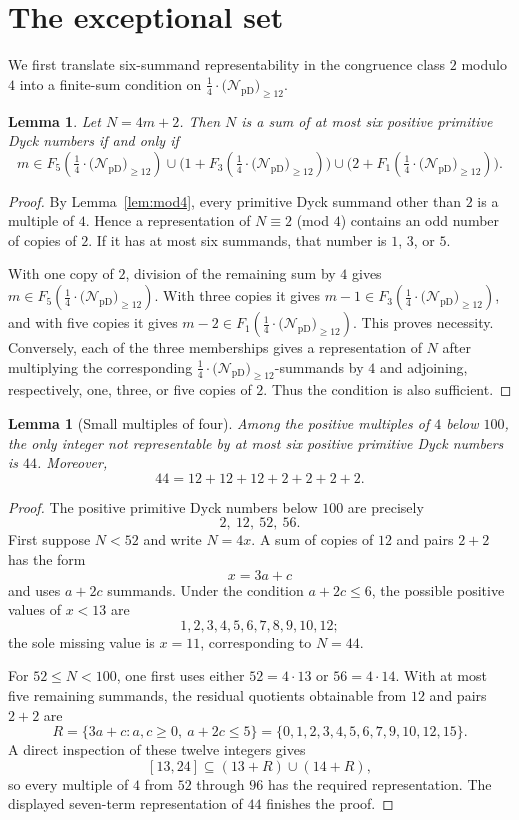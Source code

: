 \documentclass[12pt]{article}
\theoremstyle{plain}
\newtheorem{lemma}[theorem]{Lemma}
\newcommand{\Pset}{\tfrac14\cdot
  \bigl(\mathcal N_{\mathrm{pD}}\bigr)_{\ge 12}}
\begin{document}
\section{The exceptional set}\label{sec:exceptions}

We first translate six-summand representability in the congruence class
$2$ modulo $4$ into a finite-sum condition on $\Pset$.

\begin{lemma}\label{lem:sixcriterion}
Let $N=4m+2$.  Then $N$ is a sum of at most six positive primitive Dyck
numbers if and only if
\[
 m\in F_5(\Pset)
 \cup\bigl(1+F_3(\Pset)\bigr)
 \cup\bigl(2+F_1(\Pset)\bigr).
\]
\end{lemma}

\begin{proof}
By Lemma~\ref{lem:mod4}, every primitive Dyck summand other than $2$ is
a multiple of $4$.  Hence a representation of $N\equiv2$ (mod $4$) contains
an odd number of copies of $2$.  If it has at most six summands, that
number is $1$, $3$, or $5$.

With one copy of $2$, division of the remaining sum by $4$ gives
$m\in F_5(\Pset)$.  With three copies it gives
$m-1\in F_3(\Pset)$, and with five copies it gives
$m-2\in F_1(\Pset)$.  This proves necessity.  Conversely, each of the
three memberships gives a representation of $N$ after multiplying the
corresponding $\Pset$-summands by $4$ and adjoining, respectively, one,
three, or five copies of $2$.  Thus the condition is also sufficient.
\end{proof}

\begin{lemma}[Small multiples of four]\label{lem:smallmultiples}
Among the positive multiples of $4$ below $100$, the only integer not
representable by at most six positive primitive Dyck numbers is $44$.
Moreover,
\[
 44=12+12+12+2+2+2+2.
\]
\end{lemma}

\begin{proof}
The positive primitive Dyck numbers below $100$ are precisely
\[
 2,\ 12,\ 52,\ 56.
\]
First suppose $N<52$ and write $N=4x$.  A sum of copies of $12$ and
pairs $2+2$ has the form
\[
 x=3a+c
\]
and uses $a+2c$ summands.  Under the condition $a+2c\leq6$, the possible
positive values of $x<13$ are
\[
 1,2,3,4,5,6,7,8,9,10,12;
\]
the sole missing value is $x=11$, corresponding to $N=44$.

For $52\leq N<100$, one first uses either $52=4\cdot13$ or
$56=4\cdot14$.  With at most five remaining summands, the residual
quotients obtainable from $12$ and pairs $2+2$ are
\[
 R=\{3a+c:a,c\geq0,\ a+2c\leq5\}
   =\{0,1,2,3,4,5,6,7,9,10,12,15\}.
\]
A direct inspection of these twelve integers gives
\[
 [13,24]\subseteq(13+R)\cup(14+R),
\]
so every multiple of $4$ from $52$ through $96$ has the required
representation.  The displayed seven-term representation of $44$
finishes the proof.
\end{proof}
\end{document}
